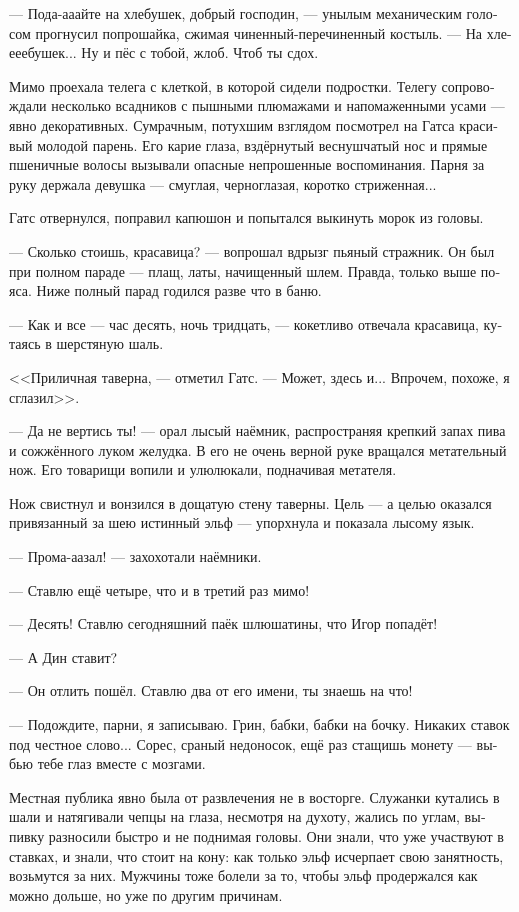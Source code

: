\documentclass[a4paper,12pt,fleqn]{book}\usepackage{polyglossia}\setdefaultlanguage[babelshorthands=true]{russian}\setotherlanguage{english}\defaultfontfeatures{Ligatures=TeX,Mapping=tex-text}\usepackage{xcolor}\newcommand{\ml}[3]{#2}
\newcommand{\asterism}{\vspace{1em}{\centering\Large\bfseries$\ast~\ast~\ast$\par}\vspace{1em}}
\begin{document}
--- Пода-ааайте на хлебушек, добрый господин, --- унылым механическим голосом прогнусил попрошайка, сжимая чиненный-перечиненный костыль.
--- На хле-ееебушек...
Ну и пёс с тобой, жлоб.
Чтоб ты сдох.

Мимо проехала телега с клеткой, в которой сидели подростки.
Телегу сопровождали несколько всадников с пышными плюмажами и напомаженными усами --- явно декоративных.
Сумрачным, потухшим взглядом посмотрел на Гатса красивый молодой парень.
Его карие глаза, вздёрнутый веснушчатый нос и прямые пшеничные волосы вызывали опасные непрошенные воспоминания.
Парня за руку держала девушка --- смуглая, черноглазая, коротко стриженная...

Гатс отвернулся, поправил капюшон и попытался выкинуть морок из головы.

\asterism

--- Сколько стоишь, красавица? --- вопрошал вдрызг пьяный стражник.
Он был при полном параде --- плащ, латы, начищенный шлем.
Правда, только выше пояса.
Ниже полный парад годился разве что в баню.

--- Как и все --- час десять, ночь тридцать, --- кокетливо отвечала красавица, кутаясь в шерстяную шаль.

<<Приличная таверна, --- отметил Гатс.
--- Может, здесь и...
Впрочем, похоже, я сглазил>>.

--- Да не вертись ты! --- орал лысый наёмник, распространяя крепкий запах пива и сожжённого луком желудка.
В его не очень верной руке вращался метательный нож.
Его товарищи вопили и улюлюкали, подначивая метателя.

Нож свистнул и вонзился в дощатую стену таверны.
Цель --- а целью оказался привязанный за шею истинный эльф --- упорхнула и показала лысому язык.

--- Прома-аазал! --- захохотали наёмники.

--- Ставлю ещё четыре, что и в третий раз мимо!

--- Десять!
Ставлю сегодняшний паёк шлюшатины, что Игор попадёт!

--- А Дин ставит?

--- Он отлить пошёл.
Ставлю два от его имени, ты знаешь на что!

--- Подождите, парни, я записываю.
Грин, бабки, бабки на бочку.
Никаких ставок под честное слово...
Сорес, сраный недоносок, ещё раз стащишь монету --- выбью тебе глаз вместе с мозгами.

Местная публика явно была от развлечения не в восторге.
Служанки кутались в шали и натягивали чепцы на глаза, несмотря на духоту, жались по углам, выпивку разносили быстро и не поднимая головы.
Они знали, что уже участвуют в ставках, и знали, что стоит на кону: как только эльф исчерпает свою занятность, возьмутся за них.
Мужчины тоже болели за то, чтобы эльф продержался как можно дольше, но уже по другим причинам.
\end{document}
